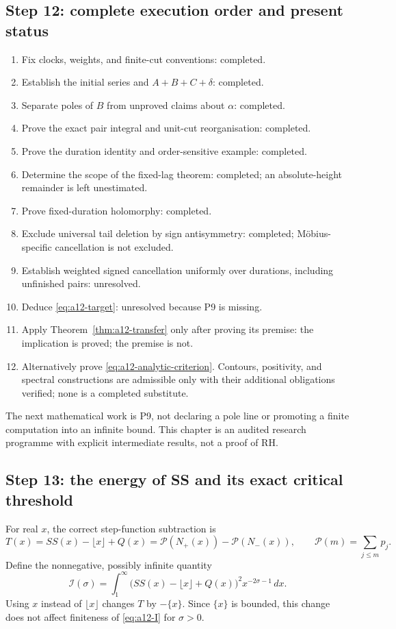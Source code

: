 \subsection{Step 12: complete execution order and present status}
\label{subsec:a12-execution}
\begin{enumerate}[label=\textup{P\arabic*.},leftmargin=*]
\item Fix clocks, weights, and finite-cut conventions: completed.
\item Establish the initial series and $A+B+C+\delta$: completed.
\item Separate poles of $B$ from unproved claims about $\alpha$: completed.
\item Prove the exact pair integral and unit-cut reorganisation: completed.
\item Prove the duration identity and order-sensitive example: completed.
\item Determine the scope of the fixed-lag theorem: completed; an
absolute-height remainder is left unestimated.
\item Prove fixed-duration holomorphy: completed.
\item Exclude universal tail deletion by sign antisymmetry: completed;
M\"obius-specific cancellation is not excluded.
\item Establish weighted signed cancellation uniformly over durations,
including unfinished pairs: unresolved.
\item Deduce \eqref{eq:a12-target}: unresolved because P9 is missing.
\item Apply Theorem~\ref{thm:a12-transfer} only after proving its premise:
the implication is proved; the premise is not.
\item Alternatively prove \eqref{eq:a12-analytic-criterion}. Contours,
positivity, and spectral constructions are admissible only with their
additional obligations verified; none is a completed substitute.
\end{enumerate}

The next mathematical work is P9, not declaring a pole line or promoting a
finite computation into an infinite bound. This chapter is an audited
research programme with explicit intermediate results, not a proof of RH.

\subsection{Step 13: the energy of SS and its exact critical threshold}
\label{subsec:a12-SS-energy}
For real $x$, the correct step-function subtraction is
\begin{equation}
\label{eq:a12-T-real}
T(x)=SS(x)-\lfloor x\rfloor+Q(x)
=\mathcal P(N_+(x))-\mathcal P(N_-(x)),\qquad
\mathcal P(m)=\sum_{j\le m}p_j.
\end{equation}
Define the nonnegative, possibly infinite quantity
\begin{equation}
\label{eq:a12-I}
\boxed{\mathcal I(\sigma)=\int_1^\infty
\bigl(SS(x)-\lfloor x\rfloor+Q(x)\bigr)^2x^{-2\sigma-1}\,dx.}
\end{equation}
Using $x$ instead of $\lfloor x\rfloor$ changes $T$ by $-\{x\}$.
Since $\{x\}$ is bounded, this change does not affect finiteness of
\eqref{eq:a12-I} for $\sigma>0$.

